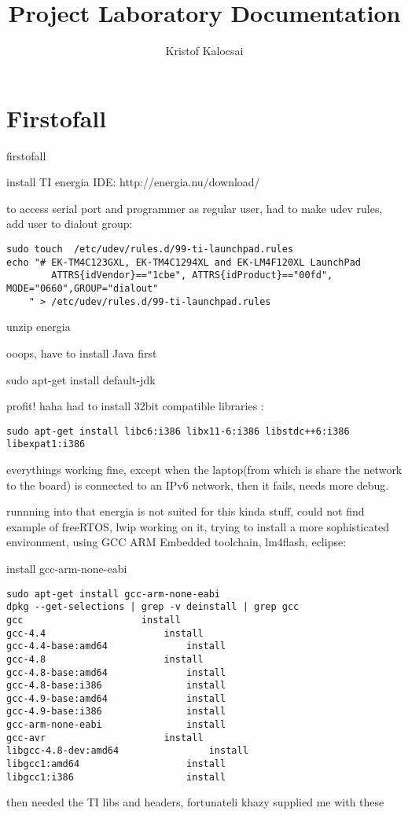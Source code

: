 \documentclass{article}
\title{Project Laboratory Documentation}
\author{Kristof Kalocsai}
\begin{document}
\maketitle
\section{Firstofall}
firstofall

install TI energia IDE:  http://energia.nu/download/

to access serial port and programmer as regular user, had to make udev rules, add user to dialout group:
\begin{verbatim}
sudo touch  /etc/udev/rules.d/99-ti-launchpad.rules
echo "# EK-TM4C123GXL, EK-TM4C1294XL and EK-LM4F120XL LaunchPad
		ATTRS{idVendor}=="1cbe", ATTRS{idProduct}=="00fd", MODE="0660",GROUP="dialout"
	" > /etc/udev/rules.d/99-ti-launchpad.rules
\end{verbatim}
unzip energia

ooops, have to install Java first

sudo apt-get install default-jdk

profit!
haha
had to install 32bit compatible libraries :
\begin{verbatim}
sudo apt-get install libc6:i386 libx11-6:i386 libstdc++6:i386 libexpat1:i386
\end{verbatim}
everythings working fine, except when the laptop(from which is share the network to the board) is connected to an IPv6 network, then it fails, needs more debug.

runnning into that energia is not suited for this kinda stuff, could not find example of freeRTOS, lwip working on it, trying to install a more sophisticated environment, using GCC ARM Embedded toolchain, lm4flash, eclipse:

install gcc-arm-none-eabi
\begin{verbatim}
sudo apt-get install gcc-arm-none-eabi
dpkg --get-selections | grep -v deinstall | grep gcc
gcc						install
gcc-4.4						install
gcc-4.4-base:amd64				install
gcc-4.8						install
gcc-4.8-base:amd64				install
gcc-4.8-base:i386				install
gcc-4.9-base:amd64				install
gcc-4.9-base:i386				install
gcc-arm-none-eabi				install
gcc-avr						install
libgcc-4.8-dev:amd64				install
libgcc1:amd64					install
libgcc1:i386					install
\end{verbatim}

then needed the TI libs and headers, fortunateli khazy supplied me with these
\end{document}
